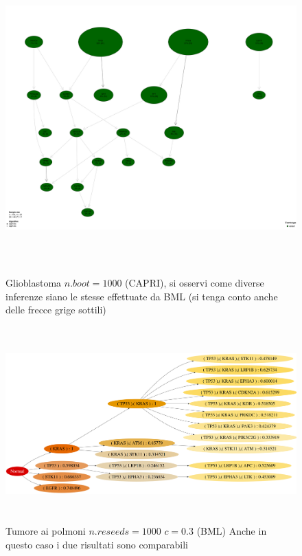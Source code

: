 \documentclass[a4paper]{article}
\begin{document}
	\begin{figure}[H]
	  \centering
	  \includegraphics[height=12cm, keepaspectratio]{GBM_SM4_capri.png}%
	  \captionsetup{justification=centering,margin=0.5cm}
	  \caption{Glioblastoma $n.boot=1000$ (CAPRI), si osservi come diverse inferenze siano le stesse effettuate da BML (si tenga conto anche delle frecce grige sottili)} 
	\end{figure}

	\begin{figure}[H]
	  \centering
	  \includegraphics[height=7.5cm, keepaspectratio]{Lung_SM4.png}%
	  \captionsetup{justification=centering,margin=0.5cm}
	  \caption{Tumore ai polmoni $n.reseeds=1000$ $c=0.3$ (BML) Anche in questo caso i due risultati sono comparabili} 
	\end{figure}
\end{document}
